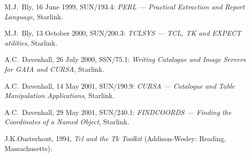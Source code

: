 \documentclass[twoside,11pt]{article}
\newcommand{\xref}[3]{#1}
\renewcommand{\_}{\texttt{\symbol{95}}}
\begin{document}

% 
{}
\begin{thebibliography}{99}

   M.J.~Bly, 16 June 1999,
   \xref{SUN/193.4}{sun193}{}: {\it PERL ---  Practical Extraction and
   Report Language}, Starlink.

   M.J.~Bly, 13 October 2000,
   \xref{SUN/200.3}{sun200}{}: {\it TCLSYS --- TCL, TK and EXPECT
   utilities}, Starlink.

   A.C.~Davenhall, 26 July 2000,
   \xref{SSN/75.1}{ssn75}{}: {\it Writing Catalogue and Image Servers for
   GAIA and CURSA}, Starlink.

   A.C.~Davenhall, 14 May 2001,
   \xref{SUN/190.9}{sun190}{}: {\it CURSA --- Catalogue and Table
   Manipulation Applications}, Starlink.

   A.C.~Davenhall, 29 May 2001,
   \xref{SUN/240.1}{sun240}{}: {\it FINDCOORDS --- Finding the Coordinates
   of a Named Object}, Starlink.

   J.K.Ousterhout, 1994, {\it Tcl and the Tk
   Toolkit}\/ (Addison-Wesley: Reading, Massachusetts).

\end{thebibliography}


\typeout{  }
\typeout{*****************************************************}
\typeout{  }
\typeout{  }
\typeout{*****************************************************}
\typeout{  }
\end{document}

